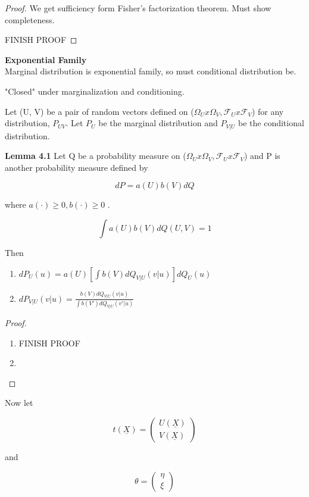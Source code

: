 \documentclass[11pt,fleqn]{book} %
\begin{document}
\begin{proof}
	We get sufficiency form Fisher's factorization theorem. Must show completeness. 

	FINISH PROOF
\end{proof}
 
\textbf{Exponential Family}\\

Marginal distribution is exponential family, so must conditional distribution be. 

"Closed" under marginalization and conditioning.

Let (U, V) be a pair of random vectors defined on ($\Omega_U x \Omega_V, \mathcal{F}_U x \mathcal{F}_V$) for any distribution, $P_{UV}$. Let $P_{U}$ be the marginal distribution and $P_{V|U}$ be the conditional distribution. 

\textbf{Lemma 4.1} Let Q be a probability measure on ($\Omega_U x \Omega_V, \mathcal{F}_U x \mathcal{F}_V$) and P is another probability measure defined by 

		$$dP = a(U) b(V) dQ $$

where $a(\cdot) \geq 0, b(\cdot) \geq 0$ . 

		$$\int a(U) b(V) dQ(U,V) = 1 $$

Then 

		\begin{enumerate}
			\item $dP_U(u) = a(U) [\int b(V) dQ_{V|U} (v|u)]dQ_U(u)$ 
			\item $dP_{V|U}(v|u) = \frac{b(V) dQ_{V|U} (v|u)}{\int b(V') dQ_{V|U} (v'|u) }$
		\end{enumerate}


\begin{proof}
	\begin{enumerate}
		\item FINISH PROOF
		\item  
	\end{enumerate}
\end{proof}


Now let 

		$$t(\underline{X}) = \begin{pmatrix}
			U(\underline{X})\\
			V(\underline{X})
		\end{pmatrix} $$

and 

		$$\theta = \begin{pmatrix}
			\eta\\
			\xi
		\end{pmatrix} $$
\end{document}
